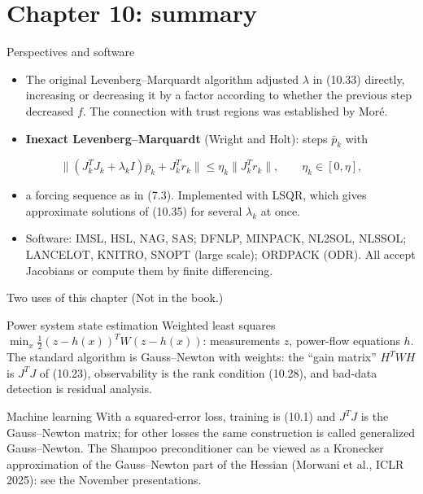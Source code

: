 \documentclass[aspectratio=169,12pt]{beamer}
\newcommand{\notinbook}{{\small(Not in the book.)}}
\begin{document}
\section{Chapter 10: summary}

\begin{frame}{Perspectives and software}
  \begin{itemize}\setlength\itemsep{0.45em}
    \item The original Levenberg--Marquardt algorithm adjusted $\lambda$ in (10.33) directly, increasing
      or decreasing it by a factor according to whether the previous step decreased $f$. The
      connection with trust regions was established by Mor\'e.
    \item \textbf{Inexact Levenberg--Marquardt} (Wright and Holt): steps $\bar p_{k}$ with
  \end{itemize}
  \[ \big\|(J_{k}^{T}J_{k}+\lambda_{k}I)\bar p_{k}+J_{k}^{T}r_{k}\big\|\le\eta_{k}\|J_{k}^{T}r_{k}\|,\qquad\eta_{k}\in[0,\eta], \]
  \begin{itemize}\setlength\itemsep{0.45em}
    \item[] a forcing sequence as in (7.3). Implemented with LSQR, which gives approximate
      solutions of (10.35) for several $\lambda_{k}$ at once.
    \item Software: IMSL, HSL, NAG, SAS; DFNLP, MINPACK, NL2SOL, NLSSOL; LANCELOT, KNITRO, SNOPT
      (large scale); ORDPACK (ODR). All accept Jacobians or compute them by finite differencing.
  \end{itemize}
\end{frame}

\begin{frame}{Two uses of this chapter \notinbook}
  \begin{block}{Power system state estimation}
    Weighted least squares $\min_{x}\tfrac12(z-h(x))^{T}W(z-h(x))$: measurements $z$, power-flow
    equations $h$. The standard algorithm is Gauss--Newton with weights: the ``gain matrix''
    $H^{T}WH$ is $J^{T}J$ of (10.23), observability is the rank condition (10.28), and bad-data
    detection is residual analysis.
  \end{block}

  \begin{block}{Machine learning}
    With a squared-error loss, training is (10.1) and $J^{T}J$ is the Gauss--Newton matrix; for
    other losses the same construction is called generalized Gauss--Newton. The Shampoo
    preconditioner can be viewed as a Kronecker approximation of the Gauss--Newton part of the
    Hessian (Morwani et al., ICLR 2025): see the November presentations.
  \end{block}
\end{frame}
\end{document}
